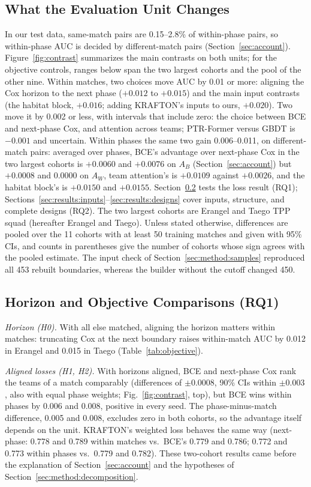 \documentclass[sigconf,anonymous]{acmart}
\begin{document}
\subsection{What the Evaluation Unit Changes}
\label{sec:results:overview}
In our test data, same-match pairs are 0.15--2.8\% of within-phase pairs, so within-phase AUC is decided by different-match pairs (Section~\ref{sec:account}). Figure~\ref{fig:contrast} summarizes the main contrasts on both units; for the objective controls, ranges below span the two largest cohorts and the pool of the other nine. Within matches, two choices move AUC by 0.01 or more: aligning the Cox horizon to the next phase ($+0.012$ to $+0.015$) and the main input contrasts (the habitat block, $+0.016$; adding KRAFTON's inputs to ours, $+0.020$). Two move it by 0.002 or less, with intervals that include zero: the choice between BCE and next-phase Cox, and attention across teams; PTR-Former versus GBDT is $-0.001$ and uncertain. Within phases the same two gain 0.006--0.011, on different-match pairs: averaged over phases, BCE's advantage over next-phase Cox in the two largest cohorts is $+0.0060$ and $+0.0076$ on $A_B$ (Section~\ref{sec:account}) but $+0.0008$ and $0.0000$ on $A_W$, team attention's is $+0.0109$ against $+0.0026$, and the habitat block's is $+0.0150$ and $+0.0155$. Section~\ref{sec:results:rq1} tests the loss result (RQ1); Sections~\ref{sec:results:inputs}--\ref{sec:results:designs} cover inputs, structure, and complete designs (RQ2). The two largest cohorts are Erangel and Taego TPP squad (hereafter Erangel and Taego). Unless stated otherwise, differences are pooled over the 11 cohorts with at least 50 training matches and given with 95\% CIs, and counts in parentheses give the number of cohorts whose sign agrees with the pooled estimate. The input check of Section~\ref{sec:method:samples} reproduced all 453 rebuilt boundaries, whereas the builder without the cutoff changed 450.

\subsection{Horizon and Objective Comparisons (RQ1)}
\label{sec:results:rq1}
\emph{Horizon (H0).} With all else matched, aligning the horizon matters within matches: truncating Cox at the next boundary raises within-match AUC by 0.012 in Erangel and 0.015 in Taego (Table~\ref{tab:objective}).

\emph{Aligned losses (H1, H2).} With horizons aligned, BCE and next-phase Cox rank the teams of a match comparably (differences of $\pm0.0008$, 90\% CIs within $\pm0.003$, also with equal phase weights; Fig.~\ref{fig:contrast}, top), but BCE wins within phases by 0.006 and 0.008, positive in every seed. The phase-minus-match difference, 0.005 and 0.008, excludes zero in both cohorts, so the advantage itself depends on the unit. KRAFTON's weighted loss behaves the same way (next-phase: 0.778 and 0.789 within matches vs.\ BCE's 0.779 and 0.786; 0.772 and 0.773 within phases vs.\ 0.779 and 0.782). These two-cohort results came before the explanation of Section~\ref{sec:account} and the hypotheses of Section~\ref{sec:method:decomposition}.
\end{document}
